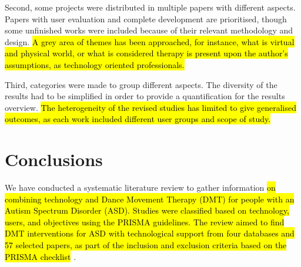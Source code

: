 \documentclass[a4paper,fleqn]{cas-sc}
\begin{document}
Second, some projects were distributed in multiple papers with different aspects. Papers with user evaluation and complete development are prioritised, though some unfinished works were included because of their relevant methodology and design. \hl{A grey area of themes has been approached, for instance, what is virtual and physical world, or what is considered therapy is present upon the author's assumptions, as technology oriented professionals.}

Third, categories were made to group different aspects. The diversity of the results had to be simplified in order to provide a quantification for the results overview. \hl{The heterogeneity of the revised studies has limited to give generalised outcomes, as each work included different user groups and scope of study.} 


\section{Conclusions}
\label{sec6:conclusion}
We have conducted a systematic literature review to gather information \hl{on combining technology and Dance Movement Therapy (DMT) for people with an Autism Spectrum Disorder (ASD). Studies were classified based on technology, users, and objectives using the PRISMA guidelines. The review aimed to find DMT interventions for ASD with technological support from four databases and 57 selected papers, as part of the inclusion and exclusion criteria based on the PRISMA checklist} \cite{Pagen71}.


\end{document}
